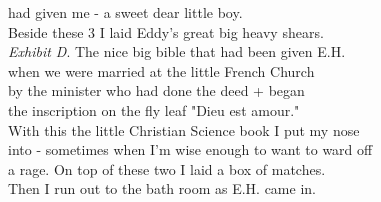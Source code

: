 \documentclass[11pt,a4paper]{article}
\begin{document}
{had given me - a sweet dear little boy. \\
\quad Beside these 3 I laid Eddy's great big heavy shears. \\
\emph{Exhibit D}. The nice big bible that had been given E.H. \\
when we were married  at the little French Church \\
by the minister who had done the deed + began \\
the inscription on the fly leaf "Dieu est amour." \\
\quad With this the little Christian Science book I put my nose \\
into - sometimes when I'm wise enough to want to ward off \\
a rage.  On top of these two I laid a box of matches. \\
\quad Then I run out to the bath room as E.H. came in.}





\end{document}
